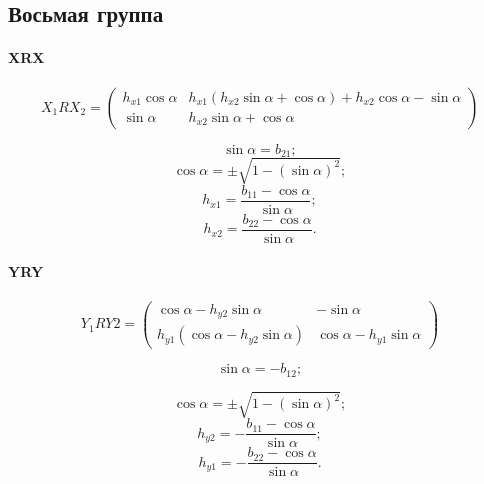 \subsection{Восьмая группа}

\paragraph{XRX}

$$X_1RX_2 = \begin{pmatrix}
	h_{x1} \cos\alpha & h_{x1} \left( h_{x2} \sin\alpha + \cos\alpha \right) + h_{x2} \cos\alpha - \sin\alpha \\
	\sin\alpha & h_{x2} \sin\alpha + \cos\alpha
\end{pmatrix}$$

$$\sin\alpha = b_{21};$$
$$\cos\alpha = \pm \sqrt{1 - (\sin\alpha)^2};$$
$$h_{x1} = \frac{b_{11} - \cos\alpha}{\sin\alpha};$$
$$h_{x2} = \frac{b_{22} - \cos\alpha}{\sin\alpha}.$$


\paragraph{YRY}

$$Y_1RY2 = \begin{pmatrix}
	\cos\alpha - h_{y2} \sin\alpha & -\sin\alpha \\
	h_{y1} \left( \cos\alpha - h_{y2} \sin\alpha \right) & \cos\alpha - h_{y1} \sin\alpha
\end{pmatrix}$$

$$\sin\alpha = - b_{12};$$

$$\cos\alpha = \pm \sqrt{1 - (\sin\alpha)^2};$$
$$h_{y2} = -\frac{b_{11} - \cos\alpha}{\sin\alpha};$$
$$h_{y1} = -\frac{b_{22} - \cos\alpha}{\sin\alpha}.$$
